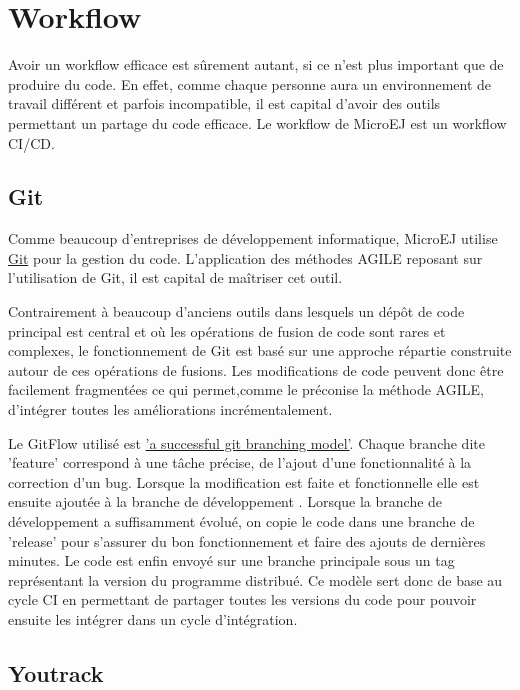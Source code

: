 \documentclass[french,a4paper,12pt]{report}
\begin{document}
\section{Workflow}

Avoir un workflow efficace est sûrement autant, si ce n’est plus important que de produire du code. En effet, comme chaque personne aura un environnement de travail différent et parfois incompatible, il est capital d’avoir des outils permettant un partage du code efficace. Le workflow de MicroEJ est un workflow CI/CD.

\subsection{Git}

Comme beaucoup d'entreprises de développement informatique, MicroEJ utilise \href{https://git-scm.com/}{Git} pour la gestion du code. L'application des méthodes AGILE reposant sur l'utilisation de Git, il est capital de maîtriser cet outil.

Contrairement à beaucoup d'anciens outils dans lesquels un dépôt de code principal est central et où les opérations de fusion de code sont rares et complexes, le fonctionnement de Git est basé sur une approche répartie construite autour de ces opérations de fusions. Les modifications de code peuvent donc être facilement fragmentées ce qui permet,comme le préconise la méthode AGILE, d'intégrer toutes les améliorations incrémentalement. 

Le GitFlow utilisé est \href{https://nvie.com/posts/a-successful-git-branching-model/}{'a successful git branching model'}. Chaque branche dite 'feature' correspond à une tâche précise, de l'ajout d'une fonctionnalité à la correction d'un bug. Lorsque la modification est faite et fonctionnelle elle est ensuite ajoutée à la branche de développement . Lorsque la branche de développement a suffisamment évolué, on copie le code dans une branche de 'release' pour s'assurer du bon fonctionnement et faire des ajouts de dernières minutes. Le code est enfin envoyé sur une branche principale sous un tag représentant la version du programme distribué.
Ce modèle sert donc de base au cycle CI en permettant de partager toutes les versions du code pour pouvoir ensuite les intégrer dans un cycle d'intégration.

\subsection{Youtrack}
\end{document}

